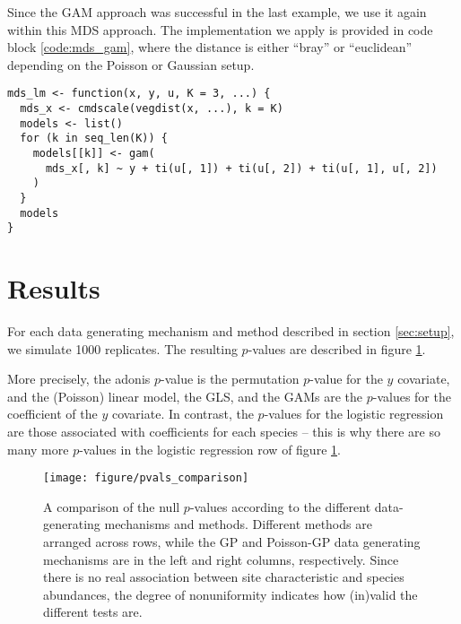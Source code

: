 \documentclass{article}
\newenvironment{code}{\captionsetup{type=listing}}{}
\begin{document}
Since the GAM approach was successful in the last example, we use it again
within this MDS approach. The implementation we apply is provided in code block
\ref{code:mds_gam}, where the distance is either ``bray'' or ``euclidean''
depending on the Poisson or Gaussian setup.

\begin{code}
\begin{verbatim}
mds_lm <- function(x, y, u, K = 3, ...) {
  mds_x <- cmdscale(vegdist(x, ...), k = K)
  models <- list()
  for (k in seq_len(K)) {
    models[[k]] <- gam(
      mds_x[, k] ~ y + ti(u[, 1]) + ti(u[, 2]) + ti(u[, 1], u[, 2])
    )
  }
  models
}
\end{verbatim}
\label{code:gam}
\end{code}

\section{Results}
\label{sec:results}

For each data generating mechanism and method described in section
\ref{sec:setup}, we simulate 1000 replicates. The resulting $p$-values are
described in figure \ref{fig:pvals_comparison}.

More precisely, the adonis $p$-value is the permutation $p$-value for the $y$
covariate, and the (Poisson) linear model, the GLS, and the GAMs are the
$p$-values for the coefficient of the $y$ covariate. In contrast, the $p$-values
for the logistic regression are those associated with coefficients for each
species -- this is why there are so many more $p$-values in the logistic
regression row of figure \ref{fig:pvals_comparison}.

\begin{figure}
  \centering
  \texttt{[image: figure/pvals\_comparison]}
  \caption{\label{fig:pvals_comparison} A comparison of the null $p$-values
    according to the different data-generating mechanisms and methods. Different
    methods are arranged across rows, while the GP and Poisson-GP data
    generating mechanisms are in the left and right columns, respectively. Since
    there is no real association between site characteristic and species
    abundances, the degree of nonuniformity indicates how (in)valid the
    different tests are.}
\end{figure}
\end{document}

